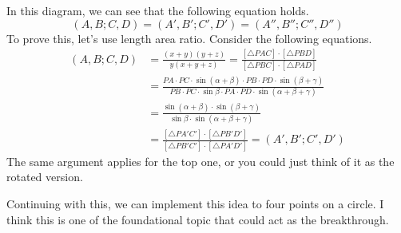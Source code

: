 \documentclass[../../../main.tex]{subfiles}
\begin{document}
\begin{figure}[H]
\end{figure}

In this diagram, we can see that the following equation holds.
\[
(A, B; C, D) = (A', B'; C', D') = (A'', B''; C'', D'')
\]
To prove this, let's use length area ratio. Consider the following
equations.
\begin{align*}
    (A, B; C, D)
    &= \frac{(x + y)(y + z)}{y (x + y + z)}
    = \frac{ [\triangle{PAC}] \cdot [\triangle{PBD}] }
        { [\triangle{PBC}] \cdot [\triangle{PAD}] } \\
    &= \frac{
        PA \cdot PC \cdot \sin(\alpha + \beta) \cdot
        PB \cdot PD \cdot \sin(\beta + \gamma)
    }{
        PB \cdot PC \cdot \sin\beta \cdot
        PA \cdot PD \cdot \sin(\alpha + \beta + \gamma)
    } \\
    &= \frac{ \sin(\alpha + \beta) \cdot \sin(\beta + \gamma) }
        { \sin\beta \cdot \sin(\alpha + \beta + \gamma) } \\
    &= \frac{ [\triangle{PA'C'}] \cdot [\triangle{PB'D'}] }
        { [\triangle{PB'C'}] \cdot [\triangle{PA'D'}] }
    = (A', B'; C', D')
\end{align*}
The same argument applies for the top one, or you could just think
of it as the rotated version.

Continuing with this, we can implement this idea to four points
on a circle. I think this is one of the foundational topic that
could act as the breakthrough.
\end{document}
